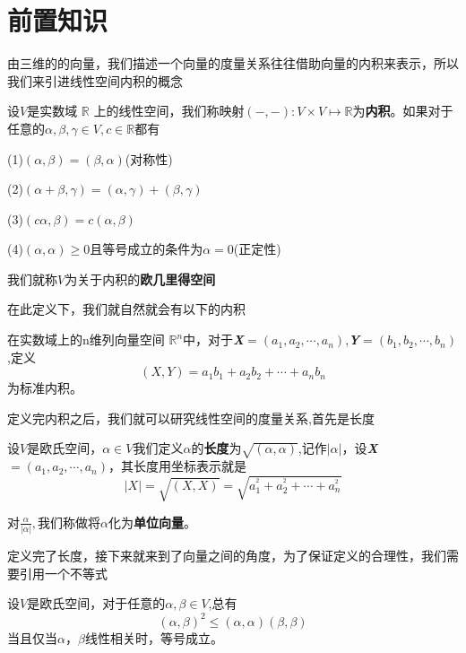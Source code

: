 \documentclass[lang=cn,10pt]{elegantbook}
\begin{document}
\section{前置知识}
	由三维的的向量，我们描述一个向量的度量关系往往借助向量的内积来表示，所以我们来引进线性空间内积的概念
	\begin{definition}
		设$V$是实数域 $\mathbb{R}$ 上的线性空间，我们称映射$(-,-):V\times V \longmapsto  \mathbb{R} $为\textbf{内积}。如果对于任意的$\alpha, \beta, \gamma \in V,c \in\mathbb{R} $都有
		
		(1)$(\alpha, \beta)=(\beta,\alpha)$(对称性)
		
		(2)$(\alpha+\beta,\gamma)=(\alpha,\gamma)+(\beta,\gamma)$
		
		(3)$(c\alpha, \beta)=c(\alpha, \beta)$
		
		(4)$(\alpha, \alpha)\ge0$且等号成立的条件为$\alpha=0$(正定性)
		
		我们就称$V$为关于内积的\textbf{欧几里得空间}
	\end{definition}
	
	在此定义下，我们就自然就会有以下的内积
	\begin{definition}[标准内积]
		在实数域上的n维列向量空间
		$\mathbb{R} ^n$中，对于\textbf{\textit{X}}$=(a_{1},a_{2},\cdots,a_{n})$,\textbf{\textit{Y}}$=(b_{1},b_{2},\cdots,b_{n})$,定义
		\begin{equation*}
			\left( X,Y \right) =a_1b_1+a_2b_2+\cdots +a_nb_n
		\end{equation*}
		为标准内积。
	\end{definition}
	
	定义完内积之后，我们就可以研究线性空间的度量关系,首先是长度
	\begin{definition}
		设$V$是欧氏空间，$\alpha \in V$我们定义$\alpha$的\textbf{长度}为$\sqrt{(\alpha,\alpha)}$,记作$|\alpha|$，设\textbf{\textit{X}}$=(a_{1},a_{2},\cdots,a_{n})$，其长度用坐标表示就是
		\begin{equation*}
			|X|=\sqrt{(X,X)}=\sqrt{a_{1}^{^{2}}+a_{2}^{^{2}}+\cdots+a_{n}^{^{2}}}
		\end{equation*}
		
		对$\frac{\alpha}{|\alpha|},$我们称做将$\alpha$化为\textbf{单位向量}。
	\end{definition}
	 
	 定义完了长度，接下来就来到了向量之间的角度，为了保证定义的合理性，我们需要引用一个不等式
	 
	 \begin{theorem}
	 	设$V$是欧氏空间，对于任意的$\alpha, \beta \in V$,总有
	 	\begin{equation*}
	 		(\alpha,\beta)^{2}\le(\alpha,\alpha)(\beta,\beta)
	 	\end{equation*}
	 	当且仅当$\alpha，\beta $线性相关时，等号成立。
	 \end{theorem}
	 
\end{document}
